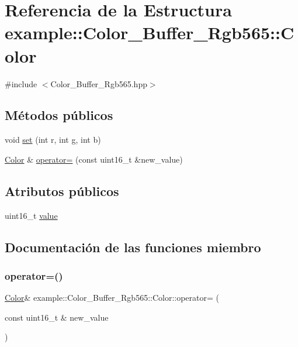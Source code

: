 \hypertarget{structexample_1_1_color___buffer___rgb565_1_1_color}{}\section{Referencia de la Estructura example\+::Color\+\_\+\+Buffer\+\_\+\+Rgb565\+::Color}
\label{structexample_1_1_color___buffer___rgb565_1_1_color}


{\ttfamily \#include $<$Color\+\_\+\+Buffer\+\_\+\+Rgb565.\+hpp$>$}

\subsection*{Métodos públicos}
\begin{DoxyCompactItemize}
\item 
void \mbox{\hyperlink{structexample_1_1_color___buffer___rgb565_1_1_color_a78ef03cc7c363dd9ab41add324d0054c}{set}} (int r, int g, int b)
\item 
\mbox{\hyperlink{structexample_1_1_color___buffer___rgb565_1_1_color}{Color}} \& \mbox{\hyperlink{structexample_1_1_color___buffer___rgb565_1_1_color_addfdba59f7668f2b49a5124dddadc4a4}{operator=}} (const uint16\+\_\+t \&new\+\_\+value)
\end{DoxyCompactItemize}
\subsection*{Atributos públicos}
\begin{DoxyCompactItemize}
\item 
uint16\+\_\+t \mbox{\hyperlink{structexample_1_1_color___buffer___rgb565_1_1_color_adca47da57dc30002d9f8f40f292a7fae}{value}}
\end{DoxyCompactItemize}


\subsection{Documentación de las funciones miembro}
\mbox{\label{structexample_1_1_color___buffer___rgb565_1_1_color_addfdba59f7668f2b49a5124dddadc4a4}} 
\subsubsection{\texorpdfstring{operator=()}{operator=()}}
{\footnotesize\ttfamily \mbox{\hyperlink{structexample_1_1_color___buffer___rgb565_1_1_color}{Color}}\& example\+::\+Color\+\_\+\+Buffer\+\_\+\+Rgb565\+::\+Color\+::operator= (\begin{DoxyParamCaption}\item[{const uint16\+\_\+t \&}]{new\+\_\+value }\end{DoxyParamCaption})\hspace{0.3cm}{\ttfamily [inline]}}

